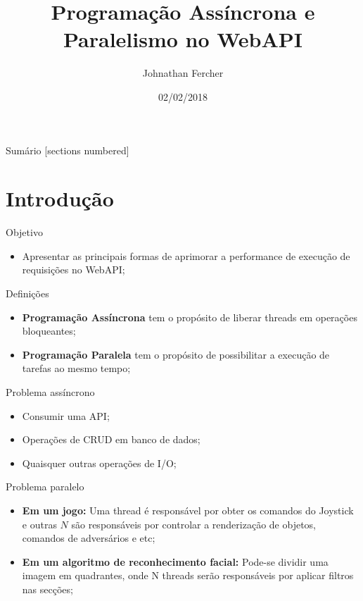 \documentclass[10pt]{beamer}
\title{Programação Assíncrona e Paralelismo no WebAPI}
\date{02/02/2018}
\author{Johnathan Fercher}
\begin{document}
\maketitle

\begin{frame}{Sumário}
  [sections numbered]
  \tableofcontents[hideallsubsections]
\end{frame}

\section{Introdução}

\begin{frame}[fragile]{Objetivo}
	\begin{itemize}
		\item Apresentar as principais formas de aprimorar a performance de execução de requisições no WebAPI;
	\end{itemize}
\end{frame}

\begin{frame}[fragile]{Definições}
	\begin{itemize}
		\item \textbf{Programação Assíncrona} tem o propósito de liberar threads em operações bloqueantes;
		\vspace{0.2cm}
		\item \textbf{Programação Paralela} tem o propósito de possibilitar a execução de tarefas ao mesmo tempo;
	\end{itemize}
\end{frame}

\begin{frame}[fragile]{Problema assíncrono}
	\begin{itemize}
		\item Consumir uma API;
		\vspace{0.2cm}
		\item Operações de CRUD em banco de dados;
		\vspace{0.2cm}
		\item Quaisquer outras operações de I/O;
	\end{itemize}
\end{frame}

\begin{frame}[fragile]{Problema paralelo}
	\begin{itemize}
		\item \textbf{Em um jogo:} Uma thread é responsável por obter os comandos do Joystick e outras $N$ são responsáveis por controlar a renderização de objetos, comandos de adversários e etc;
		\vspace{0.2cm}
		\item \textbf{Em um algoritmo de reconhecimento facial:} Pode-se dividir uma imagem em quadrantes, onde N threads serão responsáveis por aplicar filtros nas secções;
	\end{itemize}
\end{frame}
\end{document}
